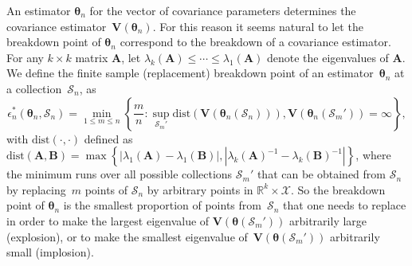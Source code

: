 \documentclass{article}
\numberwithin{equation}{section}
\theoremstyle{plain}
\newcommand{\R}{\mathbb{R}}
\newcommand{\btheta}{\bm\theta}
\newcommand{\bV}{\mathbf{V}}
\newcommand{\bA}{\mathbf{A}}
\begin{document}
An estimator $\btheta_n$ for the vector of covariance parameters determines the covariance estimator~$\bV(\btheta_n)$.
For this reason it seems natural to let the breakdown point of $\btheta_n$ correspond to the breakdown of a covariance estimator.
For any $k\times k$ matrix $\bA$, let $\lambda_k(\bA)\leq\cdots\leq\lambda_1(\bA)$ denote the eigenvalues of $\bA$.
We define the finite sample (replacement) breakdown point of an estimator~$\btheta_n$ at a collection~$\mathcal{S}_n$, as
\begin{equation}
\label{def:BDP theta}
\epsilon_n^*(\btheta_n,\mathcal{S}_n)
=
\min_{1\leq m\leq n}
\left\{
\frac{m}{n}:
\sup_{\mathcal{S}_m'}
\text{dist}(\bV(\btheta_n(\mathcal{S}_n))),\bV(\btheta_n(\mathcal{S}_m'))
=\infty
\right\},
\end{equation}
with $\text{dist}(\cdot,\cdot)$ defined as
$\text{dist}(\bA,\mathbf{B})
=
\max\left\{
\left|\lambda_1(\bA)-\lambda_1(\mathbf{B})\right|,
\left|\lambda_k(\bA)^{-1}-\lambda_k(\mathbf{B})^{-1}\right|
\right\}$,
where the minimum runs over all possible collections $\mathcal{S}_m'$ that can be obtained from $\mathcal{S}_n$
by replacing~$m$ points of $\mathcal{S}_n$ by arbitrary points in $\R^k\times \mathcal{X}$.
So the breakdown point of $\btheta_n$ is the smallest proportion of points from~$\mathcal{S}_n$ that one needs to replace in order to
make the largest eigenvalue of $\bV(\btheta(\mathcal{S}_m'))$ arbitrarily large (explosion), or
to make the smallest eigenvalue of~$\bV(\btheta(\mathcal{S}_m'))$ arbitrarily small (implosion).
\end{document}
